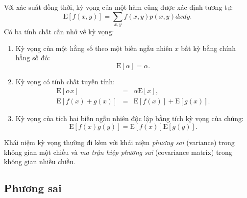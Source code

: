 Với xác suất đồng thời, kỳ vọng của một hàm cũng được xác định tương tự:
\begin{equation}
\label{eqn:30_24}
  \text{E}[f(x, y)] = \sum_{x,y} f(x, y) p(x, y) dx dy.
\end{equation}
Có ba tính chất cần nhớ về kỳ vọng:
\begin{enumerate}
    \item Kỳ vọng của một hằng số theo một biến ngẫu nhiên $x$ bất kỳ bằng chính hằng số đó:
    \begin{equation}
        \label{eqn:30_25}
        \text{E}[\alpha] = \alpha.
    \end{equation}
    \item Kỳ vọng có tính chất tuyến tính:
    \begin{eqnarray}
        \label{eqn:30_26}
        \text{E}[\alpha x] & = & \alpha \text{E}[x],  \\
        \label{eqn:30_27}
        \text{E}[f(x) + g(x)] & = & \text{E}[f(x)] + \text{E}[g(x)].
    \end{eqnarray}
    \item Kỳ vọng của tích hai biến ngẫu nhiên độc lập bằng tích kỳ vọng của chúng:
    \begin{equation}
        \label{eqn:30_28}
        \text{E}[f(x) g(y)] = \text{E}[f(x)] \text{E}[g(y)].
    \end{equation}

\end{enumerate}



Khái niệm kỳ vọng thường đi kèm với khái niệm \textit{phương
sai} (variance) trong không gian một chiều và \textit{ma trận hiệp
phương sai} (covariance matrix) trong không gian nhiều chiều. 

\subsection{Phương sai} %

